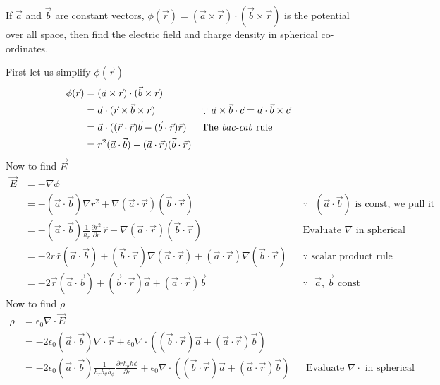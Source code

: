 \documentclass[../main.tex]{subfiles}
\begin{document}
\begin{questions}
\question  If $\vec{a}$ and $\vec{b}$ are constant vectors, $\phi (\vec{r}) = (\vec{a} \times \vec{r}) \cdot (\vec{b} \times \vec{r}) $ is the potential over all space, then find the electric field and charge density in spherical co-ordinates.
\newline
[Hint: $\vec{E} = -\nabla\phi$, $\rho = \epsilon_0 \nabla\cdot \vec{E}$]
\begin{solution}
	First let us simplify $\phi(\vec{r})$
	\begin{align}
		\phi (\vec{r}) &= (\vec{a} \times \vec{r}) \cdot (\vec{b} \times \vec{r})\\
		&= \vec{a}\cdot (\vec{r} \times \vec{b} \times \vec{r}) && \text{$\because$ $\vec{a}\times\vec{b}\cdot\vec{c}=\vec{a}\cdot\vec{b}\times\vec{c}$}\\
		&= \vec{a}\cdot((\vec{r}\cdot\vec{r})\vec{b}-(\vec{b}\cdot\vec{r})\vec{r}) && \text{The \textit{bac-cab} rule}\\
		&= r^2(\vec{a}\cdot\vec{b}) - (\vec{a}\cdot\vec{r})(\vec{b}\cdot\vec{r})
	\end{align}
	Now to find $\vec{E}$
	\begin{align}
		\vec{E} &= -\nabla\phi\\
		&= -(\vec{a}\cdot\vec{b})\nabla r^2+\nabla (\vec{a}\cdot\vec{r})(\vec{b}\cdot\vec{r}) && \text{$\because$ $(\vec{a}\cdot\vec{b})$ is const, we pull it out}\\
		&= -(\vec{a}\cdot\vec{b})\frac{1}{h_r}\frac{\partial r^2}{\partial r}\,\hat{r} + \nabla(\vec{a}\cdot\vec{r})(\vec{b}\cdot\vec{r}) && \text{Evaluate $\nabla$ in spherical}\\
		&= -2r\,\hat{r}(\vec{a}\cdot\vec{b}) + (\vec{b}\cdot\vec{r})\nabla(\vec{a}\cdot\vec{r}) + (\vec{a}\cdot\vec{r})\nabla(\vec{b}\cdot\vec{r}) && \text{$\because$ scalar product rule of gradient}\\
		&= \boxed{-2\vec{r}(\vec{a}\cdot\vec{b}) + (\vec{b}\cdot\vec{r})\vec{a} + (\vec{a}\cdot\vec{r})\vec{b}} && \text{$\because$ $\vec{a}$, $\vec{b}$ const}
	\end{align}
	Now to find $\rho$
	\begin{align}
		\rho &= \epsilon_0 \nabla\cdot \vec{E}\\
		&= -2\epsilon_0(\vec{a}\cdot\vec{b})\nabla\cdot\vec{r} + \epsilon_0\nabla\cdot( (\vec{b}\cdot\vec{r})\vec{a} + (\vec{a}\cdot\vec{r})\vec{b})\\
		&= -2\epsilon_0(\vec{a}\cdot\vec{b})\frac{1}{h_rh_\theta h_\phi}\frac{\partial r h_\theta h\phi}{\partial r} + \epsilon_0\nabla\cdot( (\vec{b}\cdot\vec{r})\vec{a} + (\vec{a}\cdot\vec{r})\vec{b}) && \text{Evaluate $\nabla\cdot$ in spherical}\\

\end{align}
\end{solution}
\end{questions}
\end{document}
